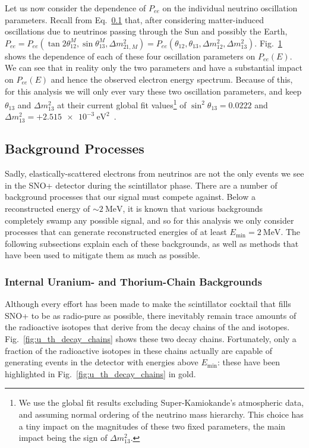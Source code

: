 Let us now consider the dependence of $P_{ee}$ on the individual neutrino oscillation parameters. Recall from Eq.~\ref{} %
that, after considering matter-induced oscillations due to neutrinos passing through the Sun and possibly the Earth, $P_{ee} = P_{ee}\left(\tan2\theta^{M}_{12}, \sin\theta^{M}_{13}, \Delta m^{2}_{21,M}\right) = P_{ee}\left(\theta_{12}, \theta_{13}, \Delta m^{2}_{12}, \Delta m^{2}_{13}\right)$. Fig.~\ref{fig:pee_osc_param_dependence} shows the dependence of each of these four oscillation parameters on $P_{ee}(E)$. We can see that in reality only the two parameters \dmsq{} and \tonetwo{} have a substantial impact on $P_{ee}(E)$ and hence the observed electron energy spectrum. Because of this, for this analysis we will only ever vary these two oscillation parameters, and keep $\theta_{13}$ and $\Delta m^{2}_{13}$ at their current global fit values\footnote{We use the global fit results excluding Super-Kamiokande's atmospheric data, and assuming normal ordering of the neutrino mass hierarchy. This choice has a tiny impact on the magnitudes of these two fixed parameters, the main impact being the sign of $\Delta m^{2}_{13}$.} %
of $\sin^{2}\theta_{13} = 0.0222$ and $\Delta m^{2}_{13} = +\SI{2.515e-3}{\eV\squared}$~\cite{}.%

\begin{figure}
    \centering
    \caption[]{}
    \label{fig:pee_osc_param_dependence}
\end{figure}

\subsection{Background Processes}
Sadly, elastically-scattered electrons from \beight{} neutrinos are not the only events we see in the SNO+ detector during the scintillator phase. There are a number of background processes that our signal must compete against. Below a reconstructed energy of $\sim\SI{2}{\MeV}$, it is known that various backgrounds completely swamp any possible \beight{} signal, and so for this analysis we only consider processes that can generate reconstructed energies of at least $E_{\textrm{min}} = \SI{2}{\MeV}$. The following subsections explain each of these backgrounds, as well as methods that have been used to mitigate them as much as possible.

\subsubsection{Internal Uranium- and Thorium-Chain Backgrounds}\label{sec:u_th_internals}
Although every effort has been made to make the scintillator cocktail that fills SNO+ to be as radio-pure as possible, there inevitably remain trace amounts of the radioactive isotopes that derive from the decay chains of the  and  isotopes. Fig.~\ref{fig:u_th_decay_chains} shows these two decay chains. Fortunately, only a fraction of the radioactive isotopes in these chains actually are capable of generating events in the detector with energies above $E_{\textrm{min}}$: these have been highlighted in Fig.~\ref{fig:u_th_decay_chains} in gold.

